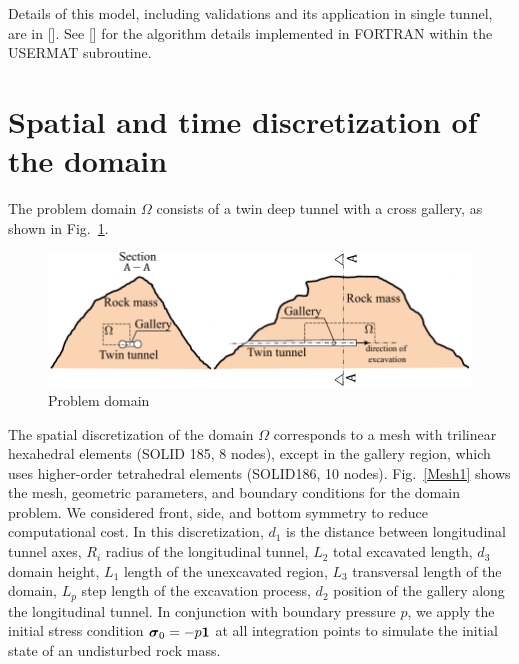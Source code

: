 \documentclass[a4paper,fleqn]{cas-sc}
\begin{document}
Details of this model, including validations and its application in single tunnel, are in []. See [] for the algorithm details implemented in FORTRAN within the USERMAT subroutine.

\section{Spatial and time discretization of the domain}\label{}

The problem domain $\Omega$ consists of a twin deep tunnel with a cross gallery, as shown in Fig.~\ref{domain}.
\begin{figure}[h!]
	\centering
	\includegraphics[scale=1]{Domain.pdf}
	\caption{Problem domain}
	\label{domain}
\end{figure}
\FloatBarrier
The spatial discretization of the domain $\Omega$ corresponds to a mesh with trilinear hexahedral elements (SOLID 185, 8 nodes), except in the gallery region, which uses higher-order tetrahedral elements (SOLID186, 10 nodes). Fig.~\ref{Mesh1} shows the mesh, geometric parameters, and boundary conditions for the domain problem. We considered front, side, and bottom symmetry to reduce computational cost. In this discretization, $d_1$ is the distance between longitudinal tunnel axes, $R_i$ radius of the longitudinal tunnel, $L_2$ total excavated length, $d_3$ domain height, $L_1$ length of the unexcavated region, $L_3$ transversal length of the domain, $L_p$ step length of the excavation process, $d_2$ position of the gallery along the longitudinal tunnel. In conjunction with boundary pressure $p$, we apply the initial stress condition $\boldsymbol{\sigma}_0 = -p\boldsymbol{1}$ at all integration points to simulate the initial state of an undisturbed rock mass. 
\end{document}
